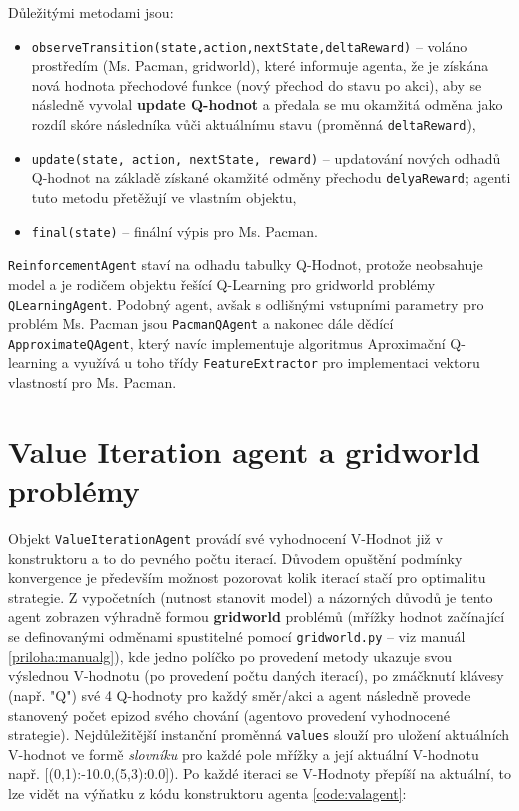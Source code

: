 Důležitými metodami jsou:
\begin{itemize}
\item \texttt{observeTransition(state,action,nextState,deltaReward)} -- voláno prostředím (Ms. Pacman, gridworld), které informuje agenta, že je získána nová hodnota přechodové funkce (nový přechod do stavu po akci), aby se následně vyvolal \textbf{update Q-hodnot} a předala se mu okamžitá odměna jako rozdíl skóre následníka vůči aktuálnímu stavu (proměnná \texttt{deltaReward}),
\item \texttt{update(state, action, nextState, reward)} -- updatování nových odhadů Q-hodnot na základě získané okamžité odměny přechodu \texttt{delyaReward}; agenti tuto metodu přetěžují ve vlastním objektu,
\item \texttt{final(state)} -- finální výpis pro Ms. Pacman.
\end{itemize}
\texttt{ReinforcementAgent} staví na odhadu tabulky Q-Hodnot, protože neobsahuje model a je rodičem objektu řešící Q-Learning pro gridworld problémy \texttt{QLearningAgent}. Podobný agent, avšak s odlišnými vstupními parametry pro problém Ms. Pacman jsou \texttt{PacmanQAgent} a nakonec dále dědící \texttt{ApproximateQAgent}, který navíc implementuje algoritmus Aproximační Q-learning a využívá u toho třídy \texttt{FeatureExtractor} pro implementaci vektoru vlastností pro Ms. Pacman.

\section{Value Iteration agent a gridworld problémy}
Objekt \texttt{ValueIterationAgent} provádí své vyhodnocení V-Hodnot již v konstruktoru a to do pevného počtu iterací. Důvodem opuštění podmínky konvergence je především možnost pozorovat kolik iterací stačí pro optimalitu strategie. Z vypočetních (nutnost stanovit model) a názorných důvodů je tento agent zobrazen výhradně formou \textbf{gridworld} problémů (mřížky hodnot začínající se definovanými odměnami spustitelné pomocí \texttt{gridworld.py} -- viz manuál \ref{priloha:manualg}), kde jedno políčko po provedení metody ukazuje svou výslednou V-hodnotu (po provedení počtu daných iterací), po zmáčknutí klávesy (např. "Q") své 4 Q-hodnoty pro každý směr/akci a agent následně provede stanovený počet epizod svého chování (agentovo provedení vyhodnocené strategie). 
\newpage
Nejdůležitější instanční proměnná \texttt{values} slouží pro uložení aktuálních V-hodnot ve formě \textit{slovníku} pro každé pole mřížky a její aktuální V-hodnotu např. [(0,1):-10.0,(5,3):0.0]). Po každé iteraci se V-Hodnoty přepíší na aktuální, to lze vidět na výňatku z kódu konstruktoru agenta \ref{code:valagent}:

